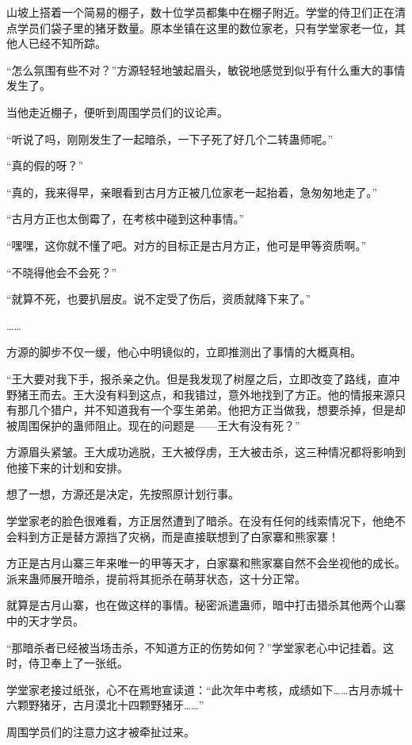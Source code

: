 \begin{this_body}
山坡上搭着一个简易的棚子，数十位学员都集中在棚子附近。学堂的侍卫们正在清点学员们袋子里的猪牙数量。原本坐镇在这里的数位家老，只有学堂家老一位，其他人已经不知所踪。

“怎么氛围有些不对？”方源轻轻地皱起眉头，敏锐地感觉到似乎有什么重大的事情发生了。

当他走近棚子，便听到周围学员们的议论声。

“听说了吗，刚刚发生了一起暗杀，一下子死了好几个二转蛊师呢。”

“真的假的呀？”

“真的，我来得早，亲眼看到古月方正被几位家老一起抬着，急匆匆地走了。”

“古月方正也太倒霉了，在考核中碰到这种事情。”

“嘿嘿，这你就不懂了吧。对方的目标正是古月方正，他可是甲等资质啊。”

“不晓得他会不会死？”

“就算不死，也要扒层皮。说不定受了伤后，资质就降下来了。”

……

方源的脚步不仅一缓，他心中明镜似的，立即推测出了事情的大概真相。

“王大要对我下手，报杀亲之仇。但是我发现了树屋之后，立即改变了路线，直冲野猪王而去。王大没有料到这点，和我错过，意外地找到了方正。他的情报来源只有那几个猎户，并不知道我有一个孪生弟弟。他把方正当做我，想要杀掉，但是却被周围保护的蛊师阻止。现在的问题是——王大有没有死？”

方源眉头紧皱。王大成功逃脱，王大被俘虏，王大被击杀，这三种情况都将影响到他接下来的计划和安排。

想了一想，方源还是决定，先按照原计划行事。

学堂家老的脸色很难看，方正居然遭到了暗杀。在没有任何的线索情况下，他绝不会料到方正是替方源挡了灾祸，而是直接联想到了白家寨和熊家寨！

方正是古月山寨三年来唯一的甲等天才，白家寨和熊家寨自然不会坐视他的成长。派来蛊师展开暗杀，提前将其扼杀在萌芽状态，这十分正常。

就算是古月山寨，也在做这样的事情。秘密派遣蛊师，暗中打击猎杀其他两个山寨中的天才学员。

“那暗杀者已经被当场击杀，不知道方正的伤势如何？”学堂家老心中记挂着。这时，侍卫奉上了一张纸。

学堂家老接过纸张，心不在焉地宣读道：“此次年中考核，成绩如下……古月赤城十六颗野猪牙，古月漠北十四颗野猪牙……”

周围学员们的注意力这才被牵扯过来。


\end{this_body}
